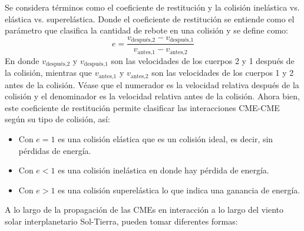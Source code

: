 Se considera términos como el coeficiente de restitución y la colisión inelástica vs. elástica vs. superelástica. Donde el coeficiente de restitución se entiende como el parámetro que clasifica la cantidad de rebote en una colisión y se define como:
\begin{equation}
   e=\frac{{v_{\text{después,2}}-v_{\text{después,1}}}}{v_{\text{antes,1}}-v_{\text{antes,2}}} 
\end{equation}
En donde $v_{\text{después,2}}$ y $v_{\text{después,1}}$ son las velocidades de los cuerpos 2 y 1 después de la colisión, mientras que $v_{\text{antes,1}}$ y $v_{\text{antes,2}}$ son las velocidades de los cuerpos 1 y 2 antes de la colisión. Véase que el numerador es la velocidad relativa después de la colisión y el denominador es la velocidad relativa antes de la colisión. Ahora bien, este coeficiente de restitución permite clasificar las interacciones CME-CME según su tipo de colisión, así:
\begin{itemize}
    \item Con $e=1$ es una colisión elástica que es un colisión ideal, es decir, sin pérdidas de energía.
\item Con $e<1$ es una colisión inelástica en donde hay pérdida de energía. 
\item Con $e>1$ es una colisión superelástica lo que indica una ganancia de energía.
\end{itemize}



A lo largo de la propagación de las \acp{CME} en interacción a lo largo del viento solar interplanetario Sol-Tierra, pueden tomar diferentes formas:

